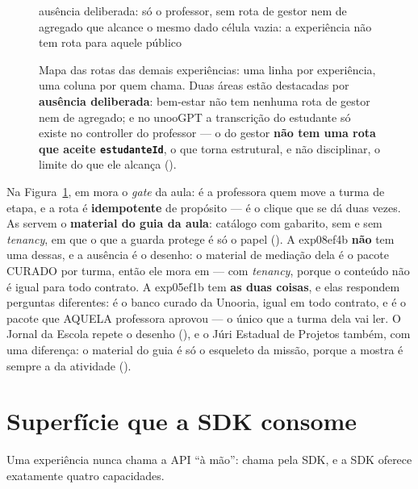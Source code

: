 \begin{figure}[H]
{\begin{tikzpicture}[x=1cm, y=1cm,
    rt/.style={c4component, text width=40mm, font=\scriptsize},
    exprot/.style={anchor=west, font=\scriptsize, text width=20mm, align=left,
                   inner sep=0pt}]
\end{tikzpicture}}
\begin{legendadiag}
 ausência deliberada: só o professor,
sem rota de gestor nem de agregado que alcance o mesmo dado \quad
célula vazia: a experiência não tem rota para aquele público
\end{legendadiag}
\caption[Mapa de rotas da API --- demais experiências]{Mapa das rotas das
  demais experiências: uma linha por experiência, uma coluna por quem chama.
  Duas áreas estão destacadas por \textbf{ausência deliberada}: bem-estar não
  tem nenhuma rota de gestor nem de agregado; e no unooGPT a transcrição do
  estudante só existe no controller do professor --- o do gestor \textbf{não tem
  uma rota que aceite \texttt{estudanteId}}, o que torna estrutural, e não
  disciplinar, o limite do que ele alcança ().}
\label{fig:mapa-rotas-exps}
\end{figure}

Na Figura~\ref{fig:mapa-rotas-exps}, em  mora o
\emph{gate} da aula: é a professora quem move a turma de etapa, e a rota é
\textbf{idempotente} de propósito --- é o clique que se dá duas vezes. As
 servem o \textbf{material do guia da aula}:
catálogo com gabarito, sem  e sem \emph{tenancy}, em que o que
a guarda protege é só o papel (). A exp08ef4b \textbf{não} tem uma
dessas, e a ausência é o desenho: o material de mediação dela é o pacote
CURADO por turma, então ele mora em 
--- com \emph{tenancy}, porque o conteúdo não é igual para todo contrato. A
exp05ef1b tem \textbf{as duas coisas}, e elas respondem perguntas diferentes:
 é o banco curado da Unooria,
igual em todo contrato, e  é o
pacote que AQUELA professora aprovou --- o único que a turma dela vai ler. O
Jornal da Escola repete o desenho (), e o Júri Estadual de
Projetos também, com uma diferença: o material do guia é só o esqueleto da
missão, porque a mostra é sempre a da atividade ().


\section{Superfície que a SDK consome}

Uma experiência nunca chama a API \enquote{à mão}: chama pela SDK, e a SDK
oferece exatamente quatro capacidades.

